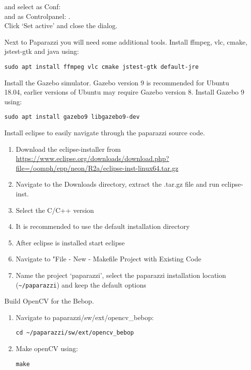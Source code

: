 \documentclass{article}
\begin{document}
\begin{enumerate}
{{and select as Conf: \\
and as Controlpanel: .\\
Click `Set active' and close the dialog.}
\item{Next to Paparazzi you will need some additional tools. Install ffmpeg, vlc, cmake, jstest-gtk and java using:
\begin{lstlisting}[style=Bash]
sudo apt install ffmpeg vlc cmake jstest-gtk default-jre
\end{lstlisting}
}
}
\item{Install the Gazebo simulator. Gazebo version 9 is recommended for Ubuntu 18.04, earlier versions of Ubuntu may require Gazebo version 8. Install Gazebo 9 using:
\begin{lstlisting}[style=Bash]
sudo apt install gazebo9 libgazebo9-dev
\end{lstlisting}
}
\item{Install eclipse to easily navigate through the paparazzi source code.
\begin{enumerate}
\item{Download the eclipse-installer from \url{https://www.eclipse.org/downloads/download.php?file=/oomph/epp/neon/R2a/eclipse-inst-linux64.tar.gz}}
\item{Navigate to the Downloads directory, extract the .tar.gz file and run eclipse-inst.}
\item{Select the C/C++ version}
\item{It is recommended to use the default installation directory}
\item{After eclipse is installed start eclipse}
\item{Navigate to "File - New - Makefile Project with Existing Code}
\item{Name the project `paparazzi', select the paparazzi installation location (\verb|~/paparazzi|) and keep the default options}
\end{enumerate}
}
\item{Build OpenCV for the Bebop.
\begin{enumerate}
\item{Navigate to paparazzi/sw/ext/opencv\_bebop:
\begin{lstlisting}[style=Bash]
cd ~/paparazzi/sw/ext/opencv_bebop
\end{lstlisting}}
\item{Make openCV using:
\begin{lstlisting}[style=Bash]
make
\end{lstlisting}}
\end{enumerate}
}
\end{enumerate}
\end{document}
